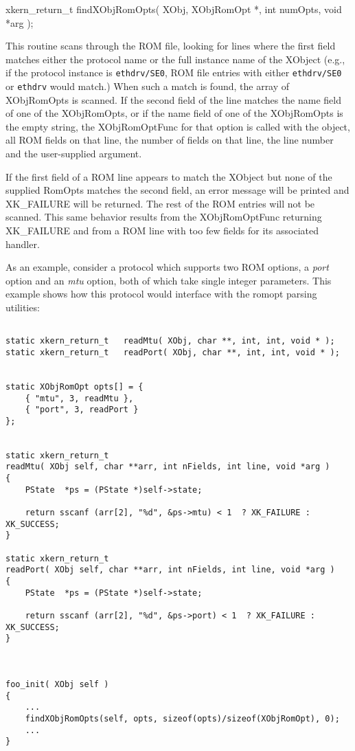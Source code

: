 \begin{enumerate}
\hfil{\sem xkern\_return\_t}
{\bold findXObjRomOpts}(
{\sem XObj}, {\sem XObjRomOpt} *, {\sem int} {\caps numOpts}, 
{\sem void } *{\caps arg}
);

This routine scans through the ROM file, looking for lines where the
first field matches either the protocol name or the
full instance name of the XObject (e.g., if the protocol instance is
{\tt ethdrv/SE0}, ROM file entries with either {\tt ethdrv/SE0} or 
{\tt ethdrv}
would match.)  When such a match is found, the array of XObjRomOpts is
scanned.  If the second field of the line matches the name field of
one of the XObjRomOpts, or if the name field of one of the XObjRomOpts is
the empty string, the XObjRomOptFunc for that option is called with
the object, all ROM fields on that line, the number of fields on that
line, the line number and the user-supplied argument.

If the first field of a ROM line appears to match the XObject but none
of the supplied RomOpts matches the second field, an error message
will be printed and XK\_FAILURE will be returned.  The rest of the ROM
entries will not be scanned.  This same behavior results from the
XObjRomOptFunc returning XK\_FAILURE and from a ROM line with too few
fields for its associated handler.

\end{enumerate}


As an example, consider a protocol which supports two ROM options, a
{\em port} option and an {\em mtu} option, both of which take single integer
parameters.  This example shows how this protocol
would interface with the romopt parsing utilities:

\break

\begin{verbatim}

static xkern_return_t	readMtu( XObj, char **, int, int, void * );
static xkern_return_t	readPort( XObj, char **, int, int, void * );


static XObjRomOpt opts[] = {
    { "mtu", 3, readMtu },
    { "port", 3, readPort }
};


static xkern_return_t 
readMtu( XObj self, char **arr, int nFields, int line, void *arg )
{
    PState	*ps = (PState *)self->state;

    return sscanf (arr[2], "%d", &ps->mtu) < 1  ? XK_FAILURE : XK_SUCCESS;
}

static xkern_return_t 
readPort( XObj self, char **arr, int nFields, int line, void *arg )
{
    PState	*ps = (PState *)self->state;

    return sscanf (arr[2], "%d", &ps->port) < 1  ? XK_FAILURE : XK_SUCCESS;
}



foo_init( XObj self ) 
{
    ...
    findXObjRomOpts(self, opts, sizeof(opts)/sizeof(XObjRomOpt), 0);
    ...
}


\end{verbatim}
